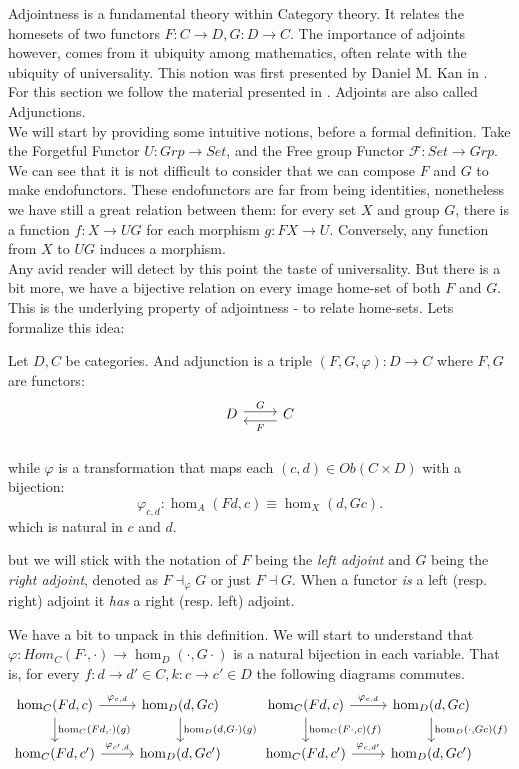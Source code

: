 Adjointness is a fundamental theory within Category theory. It relates the homesets of two functors $F:C\to D, G:D\to C$. The importance of adjoints however, comes from it ubiquity among mathematics, often relate with the ubiquity of universality. This notion was first presented by Daniel M. Kan in \cite{kan1958adjoint}. For this section we follow the material presented in \cite{mac2013categories}. Adjoints are also called Adjunctions.\\

We  will start by providing some intuitive notions, before a formal definition. Take the Forgetful Functor $U:Grp\to Set$, and the Free group Functor $\mathcal{F}:Set\to Grp$. We can see that it is not difficult to consider that we can compose $F$ and $G$ to make endofunctors. These endofunctors are far from being identities, nonetheless we have still a great relation between them: for every set $X$ and group $G$, there is a function $f: X \to UG$ for each morphism $g:FX\to U$. Conversely, any function from $X$ to $UG$ induces a morphism. \\

Any avid reader will detect by this point the taste of universality. But there is a bit more, we have a bijective relation on every image home-set of both $F$ and $G$. This is the underlying property of adjointness - to relate home-sets. Lets formalize this idea:
\begin{definition}
  Let $D,C$ be categories. And adjunction is a triple $(F,G,\varphi):D\to C$ where $F,G$ are functors:
  \[
    \begin{tikzcd}
      D\arrow[r, shift left=.5ex, "G"{name=F}] &
      C\arrow[l, shift left=1ex, "F"{name=G}] \\
    \end{tikzcd}
  \]
  while $\varphi$ is a transformation that maps each $(c,d) \in Ob(C\times D)$ with a bijection:
  \[
    \varphi_{c,d}:\hom_A(Fd, c)\equiv\hom_X(d, Gc).
  \]
  which is natural in $c$ and $d$. 
\end{definition}

\begin{remark}
  but we will stick with the notation of $F$ being the \emph{left adjoint} and $G$ being the \emph{right adjoint}, denoted as $F\dashv_\varphi G$ or just $F\dashv G$. When a functor \emph{is} a left (resp. right) adjoint it \emph{has} a right (resp. left) adjoint.\\
\end{remark}
We have a bit to unpack in this definition. We will start to understand that $\varphi:Hom_C(F\cdot, \cdot)\to \hom_D(\cdot, G\cdot)$ is a natural bijection in each variable. That is, for every $f:d\to d'\in C,k:c\to c' \in D$ the following diagrams commutes.
\[
  \begin{tikzcd}
    \hom_C(Fd,c) \arrow{d}{\hom_C(Fd,\cdot)(g)}\arrow{r}{\varphi_{c,d}}
    &\hom_D(d,Gc)\arrow{d}{\hom_D(d,G\cdot)(g)}&
    \hom_C(Fd,c) \arrow{d}{\hom_C(F\cdot,c)(f)}\arrow{r}{\varphi_{c,d}}
    &\hom_D(d,Gc)\arrow{d}{\hom_D(\cdot,Gc)(f)}\\
    \hom_C(Fd,c') \arrow{r}{\varphi_{c',d}}  &\hom_D(d,Gc')&
    \hom_C(Fd,c') \arrow{r}{\varphi_{c,d'}}  &\hom_D(d,Gc')
  \end{tikzcd}
\]

